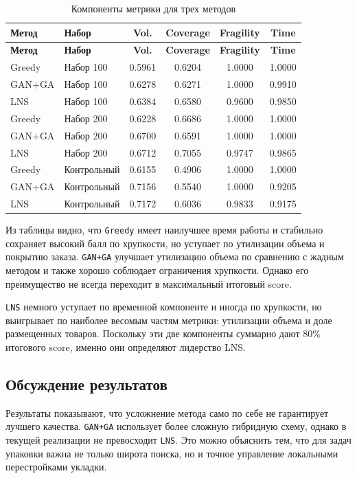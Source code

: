 \documentclass[14pt,a4paper]{extarticle}
\begin{document}
\begin{longtable}{p{}p{}cccc}
\caption{Компоненты метрики для трех методов}\label{tab:main-components}\\
\toprule
\textbf{Метод} & \textbf{Набор} & \textbf{Vol.} & \textbf{Coverage} & \textbf{Fragility} & \textbf{Time} \\
\midrule
\endfirsthead
\toprule
\textbf{Метод} & \textbf{Набор} & \textbf{Vol.} & \textbf{Coverage} & \textbf{Fragility} & \textbf{Time} \\
\midrule
\endhead
Greedy & Набор 100 & 0.5961 & 0.6204 & 1.0000 & 1.0000 \\
GAN+GA & Набор 100 & 0.6278 & 0.6271 & 1.0000 & 0.9910 \\
LNS & Набор 100 & 0.6384 & 0.6580 & 0.9600 & 0.9850 \\
Greedy & Набор 200 & 0.6228 & 0.6686 & 1.0000 & 1.0000 \\
GAN+GA & Набор 200 & 0.6700 & 0.6591 & 1.0000 & 1.0000 \\
LNS & Набор 200 & 0.6712 & 0.7055 & 0.9747 & 0.9865 \\
Greedy & Контрольный & 0.6155 & 0.4906 & 1.0000 & 1.0000 \\
GAN+GA & Контрольный & 0.7156 & 0.5540 & 1.0000 & 0.9205 \\
LNS & Контрольный & 0.7172 & 0.6036 & 0.9833 & 0.9175 \\
\bottomrule
\end{longtable}

Из таблицы видно, что \texttt{Greedy} имеет наилучшее время работы и стабильно сохраняет высокий балл по хрупкости, но уступает по утилизации объема и покрытию заказа. \texttt{GAN+GA} улучшает утилизацию объема по сравнению с жадным методом и также хорошо соблюдает ограничения хрупкости. Однако его преимущество не всегда переходит в максимальный итоговый score.

\texttt{LNS} немного уступает по временной компоненте и иногда по хрупкости, но выигрывает по наиболее весомым частям метрики: утилизации объема и доле размещенных товаров. Поскольку эти две компоненты суммарно дают 80\% итогового score, именно они определяют лидерство LNS.

\subsection{Обсуждение результатов}

Результаты показывают, что усложнение метода само по себе не гарантирует лучшего качества. \texttt{GAN+GA} использует более сложную гибридную схему, однако в текущей реализации не превосходит \texttt{LNS}. Это можно объяснить тем, что для задач упаковки важна не только широта поиска, но и точное управление локальными перестройками укладки.
\end{document}
